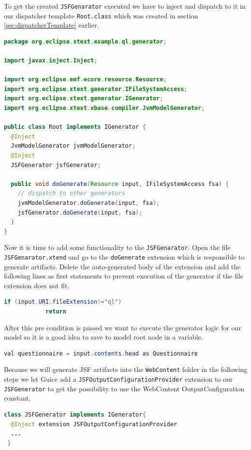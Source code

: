 To get the created \texttt{JSFGenarator} executed we have to inject and dispatch
to it in our dispatcher template \texttt{Root.class}
which was created in section \ref{sec:dispatcherTemplate}
earlier.

\begin{lstlisting}[language=Java] 
 package org.eclipse.xtext.example.ql.generator;

import javax.inject.Inject;

import org.eclipse.emf.ecore.resource.Resource;
import org.eclipse.xtext.generator.IFileSystemAccess;
import org.eclipse.xtext.generator.IGenerator;
import org.eclipse.xtext.xbase.compiler.JvmModelGenerator;

public class Root implements IGenerator {
  @Inject
  JvmModelGenerator jvmModelGenerator;
  @Inject
  JSFGenerator jsfGenerator;

  public void doGenerate(Resource input, IFileSystemAccess fsa) {
    // dispatch to other generators
    jvmModelGenerator.doGenerate(input, fsa);
    jsfGenerator.doGenerate(input, fsa);
  } 
}
\end{lstlisting}

Now it is time to add some functionality to the \texttt{JSFGenarator}. Open the
file \texttt{JSFGenarator.xtend} and go to the \texttt{doGenerate} extension
which is responsible to generate artifacts.
Delete the auto-generated body of the extension and add the following lines as
first statements to prevent execution of the generator if the file extension
does not fit.

\begin{lstlisting}[language=Java] 
  if (input.URI.fileExtension!="ql")
            return
\end{lstlisting}

After this pre condition is passed we want to execute the generator logic for
our model so it is a good idea to save to model root node in a variable.

\begin{lstlisting}[language=Java] 
  val questionnaire = input.contents.head as Questionnaire 
\end{lstlisting}

Because we will generate JSF artifacts into the \texttt{WebContent} folder in
the following steps we let Guice add a \texttt{JSFOutputConfigurationProvider}
extension to our \texttt{JSFGenerator} to get the possibility to use the
WebContent OutputConfiguration constant.

\begin{lstlisting}[language=Java] 
class JSFGenerator implements IGenerator{
  @Inject extension JSFOutputConfigurationProvider
  ...
 }
\end{lstlisting}

